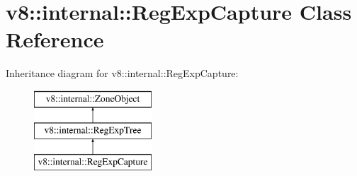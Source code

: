 \hypertarget{classv8_1_1internal_1_1RegExpCapture}{}\section{v8\+:\+:internal\+:\+:Reg\+Exp\+Capture Class Reference}
\label{classv8_1_1internal_1_1RegExpCapture}
Inheritance diagram for v8\+:\+:internal\+:\+:Reg\+Exp\+Capture\+:\begin{figure}[H]
\begin{center}
\leavevmode
\includegraphics[height=3.000000cm]{classv8_1_1internal_1_1RegExpCapture}
\end{center}
\end{figure}
